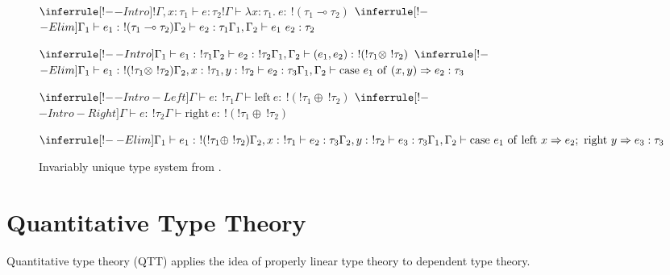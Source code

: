 \begin{mdframed}
\begin{figure}[H]
\begin{mathpar}
		\end{mathpar}
		\begin{mathpar}
			$\inferrule[!-$\multimap$-Intro]{!\Gamma, x : \tau_1 \vdash e : \tau_2}{!\Gamma \vdash \lambda x : \tau_1.\ e :\ !(\tau_1 \multimap \tau_2)}$ \hspace{1.5em}
			$\inferrule[!-$\multimap$-Elim]{\Gamma_1 \vdash e_1 :\ !(\tau_1 \multimap \tau_2) \\ \Gamma_2 \vdash e_2 : \tau_1}{\Gamma_1, \Gamma_2 \vdash e_1\ e_2 : \tau_2}$
		\end{mathpar}
		\begin{mathpar}
			$\inferrule[!-$\otimes$-Intro]{\Gamma_1 \vdash e_1 :\ !\tau_1 \\ \Gamma_2 \vdash e_2 :\ !\tau_2}{\Gamma_1, \Gamma_2 \vdash (e_1, e_2) :\ !(!\tau_1 \otimes\ !\tau_2)}$ \hspace{1.5em}
			$\inferrule[!-$\otimes$-Elim]{\Gamma_1 \vdash e_1 :\ !(!\tau_1 \otimes\ !\tau_2) \\ \Gamma_2, x :\ !\tau_1, y :\ !\tau_2 \vdash e_2 : \tau_3}{\Gamma_1, \Gamma_2 \vdash \mathrm{case}\ e_1\ \mathrm{of}\ (x, y) \Rightarrow e_2 : \tau_3}$
		\end{mathpar}
		\begin{mathpar}
			$\inferrule[!-$\oplus$-Intro-Left]{\Gamma \vdash e :\ !\tau_1}{\Gamma \vdash \mathrm{left}\ e :\ !(!\tau_1 \oplus\ !\tau_2)}$ \hspace{1.5em}
			$\inferrule[!-$\oplus$-Intro-Right]{\Gamma \vdash e :\ !\tau_2}{\Gamma \vdash \mathrm{right}\ e :\ !(!\tau_1 \oplus\ !\tau_2)}$ 
		\end{mathpar}
		\begin{mathpar}
			$\inferrule[!-$\oplus$-Elim]{\Gamma_1 \vdash e_1 :\ !(!\tau_1 \oplus\ !\tau_2) \\ \Gamma_2, x :\ !\tau_1 \vdash e_2 : \tau_3 \\ \Gamma_2, y :\ !\tau_2 \vdash e_3 : \tau_3}{\Gamma_1, \Gamma_2 \vdash \mathrm{case}\ e_1\ \mathrm{of}\ \mathrm{left}\ x \Rightarrow e_2;\ \mathrm{right}\ y \Rightarrow e_3 : \tau_3}$
		\end{mathpar}
	\caption{Invariably unique type system from \citep{wadler_is_1991}.}
	\label{fig:wadler-invariably-unique}
\end{figure}
\end{mdframed}
\vspace*{\fill}
\clearpage

\section{Quantitative Type Theory}\label{sec:qtt}
Quantitative type theory (QTT) applies the idea of properly linear type theory to dependent type theory. 

